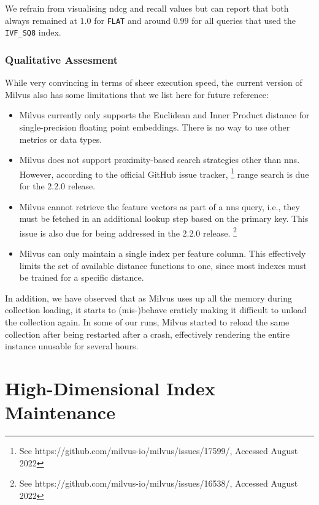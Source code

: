 We refrain from visualising n\acrshort{dcg} and recall values but can report that both always remained at $1.0$ for \texttt{FLAT} and around $0.99$ for all queries that used the \texttt{IVF\_SQ8} index.

\subsubsection{Qualitative Assesment}
While very convincing in terms of sheer execution speed, the current version of Milvus also has some limitations that we list here for future reference:

\begin{itemize}
    \item Milvus currently only supports the Euclidean and Inner Product distance for single-precision floating point embeddings. There is no way to use other metrics or data types.
    \item Milvus does not support proximity-based search strategies other than \acrshort{nns}. However, according to the official GitHub issue tracker, \footnote{See https://github.com/milvus-io/milvus/issues/17599/, Accessed August 2022} range search is due for the 2.2.0 release. 
    \item Milvus cannot retrieve the feature vectors as part of a \acrshort{nns} query, i.e., they must be fetched in an additional lookup step based on the primary key. This issue is also due for being addressed in the 2.2.0 release. \footnote{See https://github.com/milvus-io/milvus/issues/16538/, Accessed August 2022}
    \item Milvus can only maintain a single index per feature column. This effectively limits the set of available distance functions to one, since most indexes must be trained for a specific distance.
\end{itemize}

In addition, we have observed that as Milvus uses up all the memory during collection loading, it starts to (mis-)behave eraticly making it difficult to unload the collection again. In some of our runs, Milvus started to reload the same collection after being restarted after a crash, effectively rendering the entire instance unusable for several hours.

\section{High-Dimensional Index Maintenance}
\label{section:hd_index_maintenance_evaluation}


